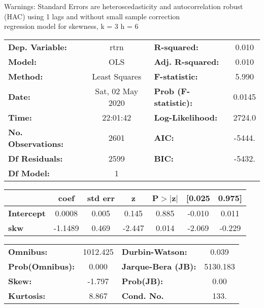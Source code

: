 Warnings: \newline
 [1] Standard Errors are heteroscedasticity and autocorrelation robust (HAC) using 1 lags and without small sample correction\\ 

regression model for skewness, k = 3 h = 6\begin{center}
\begin{tabular}{lclc}
\toprule
\textbf{Dep. Variable:}    &       rtrn       & \textbf{  R-squared:         } &     0.010   \\
\textbf{Model:}            &       OLS        & \textbf{  Adj. R-squared:    } &     0.010   \\
\textbf{Method:}           &  Least Squares   & \textbf{  F-statistic:       } &     5.990   \\
\textbf{Date:}             & Sat, 02 May 2020 & \textbf{  Prob (F-statistic):} &   0.0145    \\
\textbf{Time:}             &     22:01:42     & \textbf{  Log-Likelihood:    } &    2724.0   \\
\textbf{No. Observations:} &        2601      & \textbf{  AIC:               } &    -5444.   \\
\textbf{Df Residuals:}     &        2599      & \textbf{  BIC:               } &    -5432.   \\
\textbf{Df Model:}         &           1      & \textbf{                     } &             \\
\bottomrule
\end{tabular}
\begin{tabular}{lcccccc}
                   & \textbf{coef} & \textbf{std err} & \textbf{z} & \textbf{P$> |$z$|$} & \textbf{[0.025} & \textbf{0.975]}  \\
\midrule
\textbf{Intercept} &       0.0008  &        0.005     &     0.145  &         0.885        &       -0.010    &        0.011     \\
\textbf{skw}       &      -1.1489  &        0.469     &    -2.447  &         0.014        &       -2.069    &       -0.229     \\
\bottomrule
\end{tabular}
\begin{tabular}{lclc}
\textbf{Omnibus:}       & 1012.425 & \textbf{  Durbin-Watson:     } &    0.039  \\
\textbf{Prob(Omnibus):} &   0.000  & \textbf{  Jarque-Bera (JB):  } & 5130.183  \\
\textbf{Skew:}          &  -1.797  & \textbf{  Prob(JB):          } &     0.00  \\
\textbf{Kurtosis:}      &   8.867  & \textbf{  Cond. No.          } &     133.  \\
\bottomrule
\end{tabular}
\end{center}


